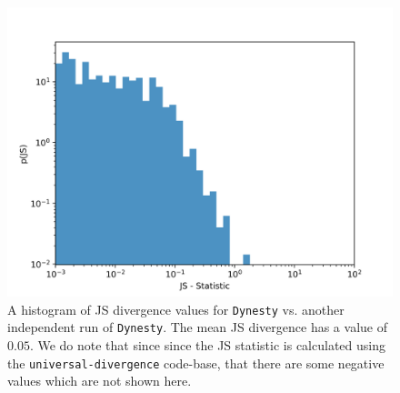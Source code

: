 \begin{figure}
    \includegraphics[width=\columnwidth]{figures/dynesty-dynesty_fullJS.png}
    \caption[Dynesty vs. Dynesty full 14-D JS divergence histogram plot.]{\label{fig:dyn_vs_dyn_ful14D_JS} A histogram of JS divergence values for \texttt{Dynesty} vs. another independent run of \texttt{Dynesty}. The mean JS divergence has a value of $0.05$. We do note that since since the JS statistic is calculated using the \texttt{universal-divergence} code-base, that there are some negative values which are not shown here.}
\end{figure}

%
%


